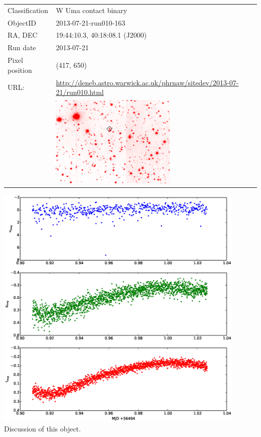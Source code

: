   \newpage
  \begin{tabular}{l l}
  Classification & W Uma contact binary \\
  ObjectID & 2013-07-21-run010-163 \\
  RA, DEC & 19:44:10.3, 40:18:08.1 (J2000) \\
  Run date & 2013-07-21 \\
  Pixel position & (417, 650) \\
  URL: & \small \url{http://deneb.astro.warwick.ac.uk/phrnaw/sitedev/2013-07-21/run010.html} \\
       & \includegraphics[width=60mm]{images/2013-07-21-run010-163.png} \\
  \end{tabular}
  \includegraphics[width=120mm]{images/2013-07-21-run010-163_lightcurve.eps} \\
  Discussion of this object.

